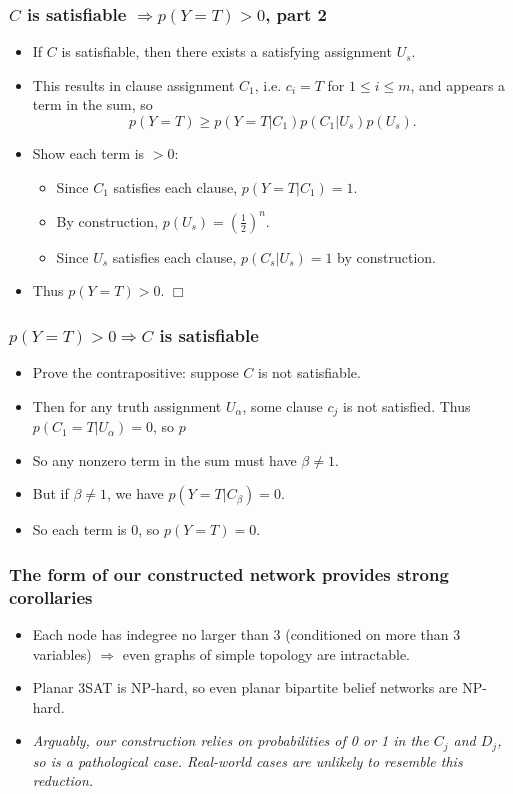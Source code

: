\documentclass{beamer}
\begin{document}
\begin{frame}
\frametitle{$C$ is satisfiable $\Rightarrow p(Y = T) > 0$, part 2}
\begin{itemize}
  \item If $C$ is satisfiable, then there exists a satisfying assignment $U_s$.
  \item This results in clause assignment $C_1$, i.e. $c_i = T$ for $1 \leq i \leq m$, and appears a term in the sum, so $$p(Y = T) \geq p(Y = T | C_1) p(C_1 | U_s) p (U_s).$$
  \item Show each term is $> 0$:
  \begin{itemize}
    \item Since $C_1$ satisfies each clause, $p(Y = T | C_1) = 1$.
    \item By construction, $p(U_s) = \left( \frac{1}{2} \right)^n$.
    \item Since $U_s$ satisfies each clause, $p(C_s | U_s) = 1$ by construction.
  \end{itemize}
  \item Thus $p(Y = T) > 0$. $\Box$
\end{itemize}
\end{frame}

\begin{frame}
\frametitle{$p(Y = T) > 0 \Rightarrow C$ is satisfiable}
\begin{itemize}
  \item Prove the contrapositive: suppose $C$ is not satisfiable.
  \item Then for any truth assignment $U_{\alpha}$, some clause $c_j$ is not satisfied. Thus $p(C_1 = T | U_{\alpha}) = 0$, so $p$
  \item So any nonzero term in the sum must have $\beta \neq 1$.
  \item But if $\beta \neq 1$, we have $p(Y = T | C_{\beta}) = 0$.
  \item So each term is 0, so $p(Y = T) = 0$.
\end{itemize}
\end{frame}

\begin{frame}
\frametitle{The form of our constructed network provides strong corollaries}
\begin{itemize}
  \item Each node has indegree no larger than 3 (conditioned on more than 3 variables) $\Rightarrow$ even graphs of simple topology are intractable.
  \item Planar 3SAT is NP-hard, so even planar bipartite belief networks are NP-hard.
  \item \emph{Arguably, our construction relies on probabilities of 0 or 1 in the $C_j$ and $D_j$, so is a pathological case. Real-world cases are unlikely to resemble this reduction.}
\end{itemize}
\end{frame}
\end{document}
